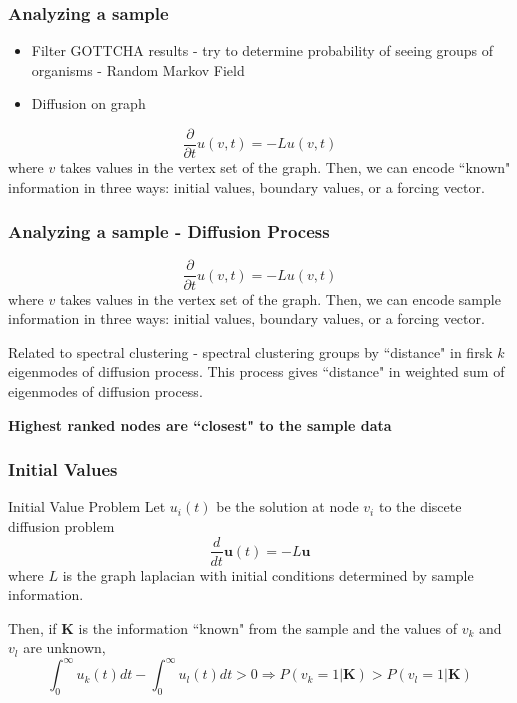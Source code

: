 \documentclass{beamer}
\renewcommand{\b}{\bm}
\begin{document}
\begin{frame}
\frametitle{Analyzing a sample}
\begin{itemize}
	\item Filter GOTTCHA results - try to determine probability of seeing groups of organisms - Random Markov Field
 	\item Diffusion on graph
\end{itemize}
\[
\frac{\partial}{\partial t} u(v,t) = -L u(v,t)
\]
where $v$ takes values in the vertex set of the graph. Then, we can encode ``known" information in three ways: initial values, boundary values, or a forcing vector.



\end{frame}
\begin{frame}
\frametitle{Analyzing a sample - Diffusion Process}
\[
\frac{\partial}{\partial t} u(v,t) = -L u(v,t)
\]
where $v$ takes values in the vertex set of the graph. Then, we can encode sample information in three ways: initial values, boundary values, or a forcing vector.

\medskip
Related to spectral clustering - spectral clustering groups by ``distance" in firsk $k$ eigenmodes of diffusion process. This process gives ``distance" in weighted sum of eigenmodes of diffusion process.

\medskip
{\bf Highest ranked nodes are ``closest" to the sample data}



\end{frame}
\begin{frame}
\frametitle{Initial Values}
\begin{block}{Initial Value Problem}
	Let $u_i(t)$ be the solution at node $v_i$ to the discete diffusion problem
	\[
	\frac{d}{dt}\b{u}(t)  = - L\b{u}
	\]
	where $L$ is the  graph laplacian with initial conditions determined by sample information.
	
	Then, if $\b{K}$ is the information ``known" from the sample and the values of $v_{k}$ and $v_{l}$ are unknown,
	\[
	\int_0^{\infty} u_k(t) dt - \int_0^{\infty} u_l(t) dt >  0 \Rightarrow  P(v_k=  1|\b{K}) > P(v_l = 1|\b{K})
	\]
\end{block}
\end{frame}
\end{document}
